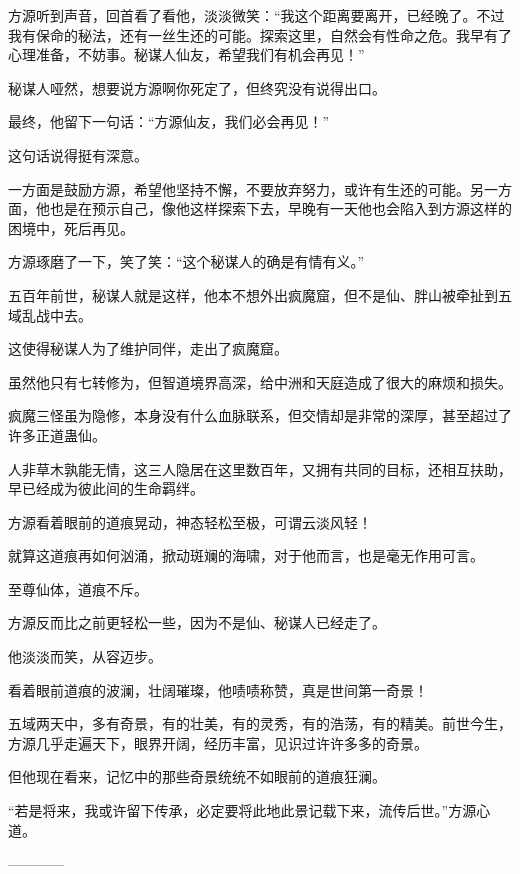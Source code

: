 \begin{this_body}
方源听到声音，回首看了看他，淡淡微笑：“我这个距离要离开，已经晚了。不过我有保命的秘法，还有一丝生还的可能。探索这里，自然会有性命之危。我早有了心理准备，不妨事。秘谋人仙友，希望我们有机会再见！”

秘谋人哑然，想要说方源啊你死定了，但终究没有说得出口。

最终，他留下一句话：“方源仙友，我们必会再见！”

这句话说得挺有深意。

一方面是鼓励方源，希望他坚持不懈，不要放弃努力，或许有生还的可能。另一方面，他也是在预示自己，像他这样探索下去，早晚有一天他也会陷入到方源这样的困境中，死后再见。

方源琢磨了一下，笑了笑：“这个秘谋人的确是有情有义。”

五百年前世，秘谋人就是这样，他本不想外出疯魔窟，但不是仙、胖山被牵扯到五域乱战中去。

这使得秘谋人为了维护同伴，走出了疯魔窟。

虽然他只有七转修为，但智道境界高深，给中洲和天庭造成了很大的麻烦和损失。

疯魔三怪虽为隐修，本身没有什么血脉联系，但交情却是非常的深厚，甚至超过了许多正道蛊仙。

人非草木孰能无情，这三人隐居在这里数百年，又拥有共同的目标，还相互扶助，早已经成为彼此间的生命羁绊。

方源看着眼前的道痕晃动，神态轻松至极，可谓云淡风轻！

就算这道痕再如何汹涌，掀动斑斓的海啸，对于他而言，也是毫无作用可言。

至尊仙体，道痕不斥。

方源反而比之前更轻松一些，因为不是仙、秘谋人已经走了。

他淡淡而笑，从容迈步。

看着眼前道痕的波澜，壮阔璀璨，他啧啧称赞，真是世间第一奇景！

五域两天中，多有奇景，有的壮美，有的灵秀，有的浩荡，有的精美。前世今生，方源几乎走遍天下，眼界开阔，经历丰富，见识过许许多多的奇景。

但他现在看来，记忆中的那些奇景统统不如眼前的道痕狂澜。

“若是将来，我或许留下传承，必定要将此地此景记载下来，流传后世。”方源心道。

------------

\end{this_body}


